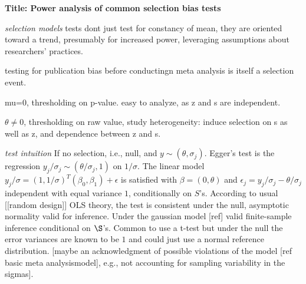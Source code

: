 \documentclass{article}
\newcommand{\gm}{\theta}
\newcommand{\s}{S}
\begin{document}
\textbf{Title: Power analysis of common selection bias tests}


\emph{selection models}
tests dont just test for constancy of mean, they are oriented toward a trend, presumably for increased power, leveraging assumptions about researchers' practices.


testing for publication bias before conductingn meta analysis is itself a selection event.


mu=0, thresholding on p-value. easy to analyze, as z and s are independent.

$\gm\neq 0$, thresholding on raw value, study heterogeneity: induce selection on s as well as z, and dependence between z and s.


\emph{test intuition}
If no selection, i.e., null, and $y\sim (\gm,\sigma_j)$. Egger's test
is the regression $y_j/\sigma_j\sim (\gm/\sigma_j,1)$ on
$1/\sigma$. The linear model
$y_j/\sigma = (1,1/\sigma)^T(\beta_0,\beta_1)+\epsilon$ is satisfied
with $\beta=(0,\gm)$ and $\epsilon_j=y_j/\sigma_j-\gm/\sigma_j$
independent with equal variance $1$, conditionally on
$\s$'s. According to usual [[random design]] OLS theory, the test is
consistent under the null, asymptotic normality valid for
inference. Under the gaussian model [ref] valid finite-sample
inference conditional on $\S$'s. Common to use a t-test but under the
null the error variances are known to be $1$ and could just use a
normal reference distribution. [maybe an acknowledgment of possible
violations of the model [ref basic meta analysismodel], e.g., not
accounting for sampling variability in the sigmas].
\end{document}
